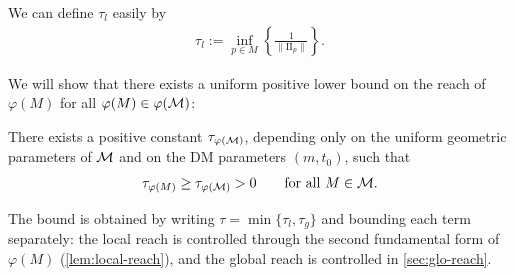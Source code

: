 We can define $\tau_l$ easily by 
\begin{align}
	\tau_l := \inf\limits_{p\in M} \left\{\frac{1}{\|\mathrm{II}_p\|}\right\}.
\end{align}

We will show that there exists a uniform positive lower bound on the reach of $\varphi(M)$ for all $\varphi(M) \in \varphi(\mathcal{M})$:
\begin{theorem}
	\label{thm:reach-bound}
	There exists a positive constant $\tau_{\varphi(\mathcal{M})}$, depending only on the uniform geometric parameters of $\mathcal{M}$ and on the DM parameters $(m,t_0)$, such that
	\begin{align}
		\tau_{\varphi(M)} \geq \tau_{\varphi(\mathcal{M})} > 0 \qquad \text{for all } M \in \mathcal{M}.
	\end{align}
\end{theorem}
The bound is obtained by writing $\tau = \min\{\tau_l,\tau_g\}$ and bounding each term separately: the local reach is controlled through the second fundamental form of $\varphi(M)$ (\cref{lem:local-reach}), and the global reach is controlled in \cref{sec:glo-reach}.








\iffalse


